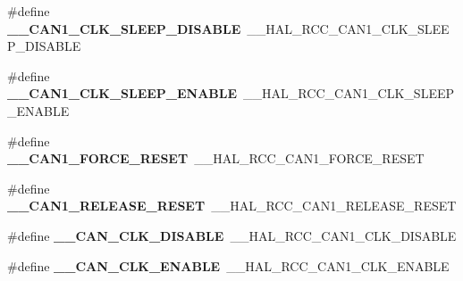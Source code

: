 \begin{DoxyCompactItemize}
\item 
\#define {\bfseries \+\_\+\+\_\+\+C\+A\+N1\+\_\+\+C\+L\+K\+\_\+\+S\+L\+E\+E\+P\+\_\+\+D\+I\+S\+A\+B\+LE}~\+\_\+\+\_\+\+H\+A\+L\+\_\+\+R\+C\+C\+\_\+\+C\+A\+N1\+\_\+\+C\+L\+K\+\_\+\+S\+L\+E\+E\+P\+\_\+\+D\+I\+S\+A\+B\+LE\hypertarget{group___h_a_l___r_c_c___aliased_gaf7ed90e300d365c10dbc7edf38d71cd9}{}\label{group___h_a_l___r_c_c___aliased_gaf7ed90e300d365c10dbc7edf38d71cd9}

\item 
\#define {\bfseries \+\_\+\+\_\+\+C\+A\+N1\+\_\+\+C\+L\+K\+\_\+\+S\+L\+E\+E\+P\+\_\+\+E\+N\+A\+B\+LE}~\+\_\+\+\_\+\+H\+A\+L\+\_\+\+R\+C\+C\+\_\+\+C\+A\+N1\+\_\+\+C\+L\+K\+\_\+\+S\+L\+E\+E\+P\+\_\+\+E\+N\+A\+B\+LE\hypertarget{group___h_a_l___r_c_c___aliased_ga5c4f52b3a404de36c14b7e004c764f7d}{}\label{group___h_a_l___r_c_c___aliased_ga5c4f52b3a404de36c14b7e004c764f7d}

\item 
\#define {\bfseries \+\_\+\+\_\+\+C\+A\+N1\+\_\+\+F\+O\+R\+C\+E\+\_\+\+R\+E\+S\+ET}~\+\_\+\+\_\+\+H\+A\+L\+\_\+\+R\+C\+C\+\_\+\+C\+A\+N1\+\_\+\+F\+O\+R\+C\+E\+\_\+\+R\+E\+S\+ET\hypertarget{group___h_a_l___r_c_c___aliased_gaa24eae8792489be2147d968eba01d7d9}{}\label{group___h_a_l___r_c_c___aliased_gaa24eae8792489be2147d968eba01d7d9}

\item 
\#define {\bfseries \+\_\+\+\_\+\+C\+A\+N1\+\_\+\+R\+E\+L\+E\+A\+S\+E\+\_\+\+R\+E\+S\+ET}~\+\_\+\+\_\+\+H\+A\+L\+\_\+\+R\+C\+C\+\_\+\+C\+A\+N1\+\_\+\+R\+E\+L\+E\+A\+S\+E\+\_\+\+R\+E\+S\+ET\hypertarget{group___h_a_l___r_c_c___aliased_ga0e51838a3ca9bd8f2c04ed1acd78c6a0}{}\label{group___h_a_l___r_c_c___aliased_ga0e51838a3ca9bd8f2c04ed1acd78c6a0}

\item 
\#define {\bfseries \+\_\+\+\_\+\+C\+A\+N\+\_\+\+C\+L\+K\+\_\+\+D\+I\+S\+A\+B\+LE}~\+\_\+\+\_\+\+H\+A\+L\+\_\+\+R\+C\+C\+\_\+\+C\+A\+N1\+\_\+\+C\+L\+K\+\_\+\+D\+I\+S\+A\+B\+LE\hypertarget{group___h_a_l___r_c_c___aliased_ga6220a8791572fb0238df8d71e7717e82}{}\label{group___h_a_l___r_c_c___aliased_ga6220a8791572fb0238df8d71e7717e82}

\item 
\#define {\bfseries \+\_\+\+\_\+\+C\+A\+N\+\_\+\+C\+L\+K\+\_\+\+E\+N\+A\+B\+LE}~\+\_\+\+\_\+\+H\+A\+L\+\_\+\+R\+C\+C\+\_\+\+C\+A\+N1\+\_\+\+C\+L\+K\+\_\+\+E\+N\+A\+B\+LE\hypertarget{group___h_a_l___r_c_c___aliased_ga1f1f9b1511361f0cfebe7983143b0005}{}\label{group___h_a_l___r_c_c___aliased_ga1f1f9b1511361f0cfebe7983143b0005}


\end{DoxyCompactItemize}
